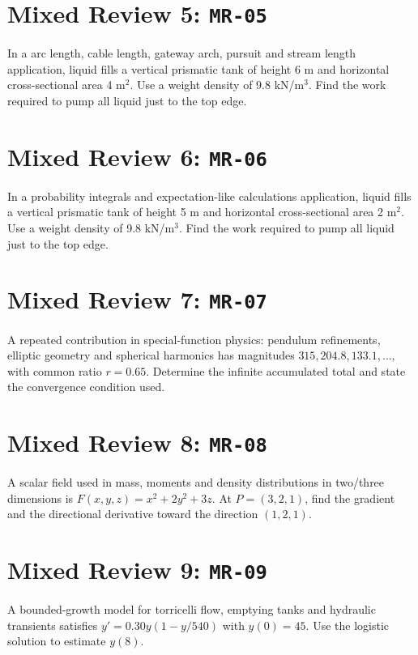 \documentclass[11pt]{book}
\newcommand{\pid}[1]{\texttt{#1}}
\newcommand{\workspace}{\par\vspace{0.7in}\hrulefill\par\vspace{0.55in}\hrulefill\par}
\begin{document}
\section*{Mixed Review 5: \pid{MR-05}}
\begin{problembox}In a arc length, cable length, gateway arch, pursuit and stream length application, liquid fills a vertical prismatic tank of height 6 m and horizontal cross-sectional area 4 m$^2$. Use a weight density of 9.8 kN/m$^3$. Find the work required to pump all liquid just to the top edge.\end{problembox}
\workspace
\section*{Mixed Review 6: \pid{MR-06}}
\begin{problembox}In a probability integrals and expectation-like calculations application, liquid fills a vertical prismatic tank of height 5 m and horizontal cross-sectional area 2 m$^2$. Use a weight density of 9.8 kN/m$^3$. Find the work required to pump all liquid just to the top edge.\end{problembox}
\workspace
\section*{Mixed Review 7: \pid{MR-07}}
\begin{problembox}A repeated contribution in special-function physics: pendulum refinements, elliptic geometry and spherical harmonics has magnitudes $315, 204.8, 133.1,\ldots$, with common ratio $r=0.65$. Determine the infinite accumulated total and state the convergence condition used.\end{problembox}
\workspace
\section*{Mixed Review 8: \pid{MR-08}}
\begin{problembox}A scalar field used in mass, moments and density distributions in two/three dimensions is $F(x,y,z)=x^2+2y^2+3z$. At $P=(3,2,1)$, find the gradient and the directional derivative toward the direction $(1,2,1)$.\end{problembox}
\workspace
\section*{Mixed Review 9: \pid{MR-09}}
\begin{problembox}A bounded-growth model for torricelli flow, emptying tanks and hydraulic transients satisfies $y'=0.30y(1-y/540)$ with $y(0)=45$. Use the logistic solution to estimate $y(8)$.\end{problembox}
\workspace
\end{document}
